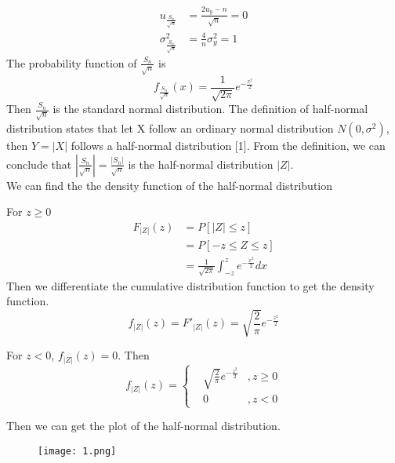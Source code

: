 \documentclass[a4paper,12pt]{article}
\begin{document}
\begin{equation*}
\begin{split}
u_{\frac{S_n}{\sqrt{n}}}&=\frac{2u_y-n}{\sqrt{n}}=0\\
\sigma_{\frac{S_n}{\sqrt{n}}}^2&=\frac{4}{n}\sigma_y^2=1
\end{split}
\end{equation*}
\noindent The probability function of $\frac{S_n}{\sqrt{n}}$ is
\begin{equation}
f_{\frac{S_n}{\sqrt{n}}}(x)=\frac{1}{\sqrt{2\pi}}e^{-\frac{x^2}{2}}
\end{equation}
\noindent Then $\frac{S_n}{\sqrt{n}}$ is the standard normal distribution. The definition of half-normal distribution states that let X follow an ordinary normal distribution $N(0,\sigma ^{2})$, then $Y=|X|$ follows a half-normal distribution [1]. From the definition, we can conclude that $|\frac{S_n}{\sqrt{n}}|=\frac{|S_n|}{\sqrt{n}}$ is the half-normal distribution $|Z|$.\\

\noindent We can find the the density function of the half-normal distribution

\noindent For $z\geq 0$
\begin{equation}
\begin{split}
F_{|Z|}(z)&=P[|Z|\leq z]\\
		  &=P[-z\leq Z \leq z]\\
		  &=\frac{1}{\sqrt{2\pi}}\int_{-z}^{z}e^{-\frac{x^2}{2}}dx
\end{split}
\end{equation}
\noindent Then we differentiate the cumulative distribution function to get the density function.
\begin{equation}
f_{|Z|}(z)=F'_{|Z|}(z)=\sqrt{\frac{2}{\pi}}e^{-\frac{z^2}{2}}
\end{equation}

\noindent For $z<0$, $f_{|Z|}(z)=0$. Then
\begin{equation}
 	f_{|Z|}(z)=
 	\left\{
 	\begin{aligned}
	 &\sqrt{\frac{2}{\pi}}e^{-\frac{z^2}{2}} &,  z\geq 0 \\
	 &0&,  z < 0
 	\end{aligned}
 	\right.
 	\end{equation}

\noindent Then we can get the plot of the half-normal distribution.\\
\begin{figure}[htb]
\centering
\texttt{[image: 1.png]}
\end{figure}
\end{document}
